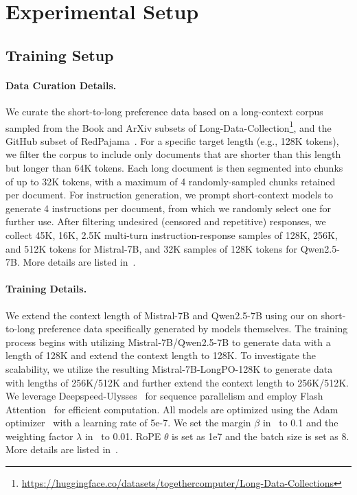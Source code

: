 \section{Experimental Setup}
\label{sec:expermental_setup}

\subsection{Training Setup}
\label{subsec:train_setup}
\paragraph{Data Curation Details.}
We curate the short-to-long preference data based on a long-context corpus sampled from the Book and ArXiv subsets of Long-Data-Collection\footnote{\url{https://huggingface.co/datasets/togethercomputer/Long-Data-Collections}}, and the GitHub subset of RedPajama~\citep{together2023redpajama}. For a specific target length (e.g., 128K tokens), we filter the corpus to include only documents that are shorter than this length but longer than 64K tokens. 
Each long document is then segmented into chunks of up to 32K tokens, with a maximum of 4 randomly-sampled chunks retained per document. For instruction generation, we prompt short-context models to generate 4 instructions per document, from which we randomly select one for further use. After filtering undesired (censored and repetitive) responses, we collect 45K, 16K, 2.5K multi-turn instruction-response samples of 128K, 256K, and 512K tokens for Mistral-7B, and 32K samples of 128K tokens for Qwen2.5-7B. More details are listed in~.


\paragraph{Training Details.} 
We extend the context length of Mistral-7B and Qwen2.5-7B using our \ourMethod{} on short-to-long preference data specifically generated by models themselves. The training process begins with utilizing Mistral-7B/Qwen2.5-7B to generate data with a length of 128K  and extend the context length to 128K. To investigate the scalability, we utilize the resulting Mistral-7B-LongPO-128K to generate data with lengths of 256K/512K and further extend the context length to 256K/512K.
We leverage Deepspeed-Ulysses~\citep{Jacobs2023DeepSpeedUS} for sequence parallelism and employ Flash Attention~\citep{dao2022flashattention,dao2023flashattention2} for efficient computation. All models are optimized using the Adam optimizer~\citep{KingmaB14} with a learning rate of 5e-7. We set the margin $\beta$ in~ to 0.1 and the weighting factor $\lambda$ in~ to 0.01. RoPE $\theta$ is set as 1e7 and the batch size is set as 8.
More details are listed in~.


